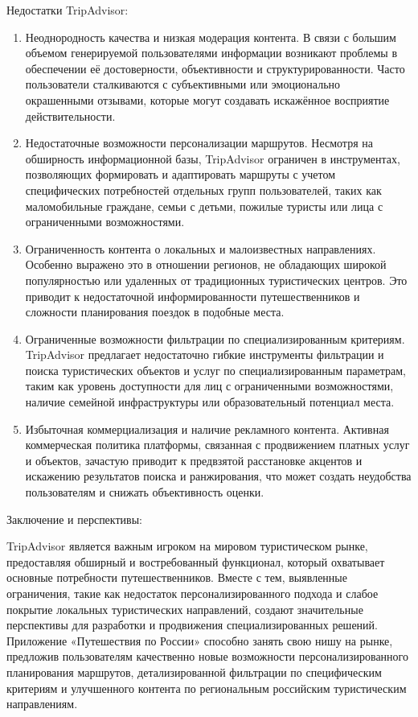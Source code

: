 \noindent Недостатки TripAdvisor:
\begin{enumerate}
    \item Неоднородность качества и низкая модерация контента. В связи с большим объемом генерируемой пользователями информации возникают проблемы в обеспечении её достоверности, объективности и структурированности. Часто пользователи сталкиваются с субъективными или эмоционально окрашенными отзывами, которые могут создавать искажённое восприятие действительности.
    \item Недостаточные возможности персонализации маршрутов. Несмотря на обширность информационной базы, TripAdvisor ограничен в инструментах, позволяющих формировать и адаптировать маршруты с учетом специфических потребностей отдельных групп пользователей, таких как маломобильные граждане, семьи с детьми, пожилые туристы или лица с ограниченными возможностями.
    \item Ограниченность контента о локальных и малоизвестных направлениях. Особенно выражено это в отношении регионов, не обладающих широкой популярностью или удаленных от традиционных туристических центров. Это приводит к недостаточной информированности путешественников и сложности планирования поездок в подобные места.
    \item Ограниченные возможности фильтрации по специализированным критериям. TripAdvisor предлагает недостаточно гибкие инструменты фильтрации и поиска туристических объектов и услуг по специализированным параметрам, таким как уровень доступности для лиц с ограниченными возможностями, наличие семейной инфраструктуры или образовательный потенциал места.
    \item Избыточная коммерциализация и наличие рекламного контента. Активная коммерческая политика платформы, связанная с продвижением платных услуг и объектов, зачастую приводит к предвзятой расстановке акцентов и искажению результатов поиска и ранжирования, что может создать неудобства пользователям и снижать объективность оценки.
\end{enumerate}

\noindent Заключение и перспективы:

TripAdvisor является важным игроком на мировом туристическом рынке, предоставляя обширный и востребованный функционал, который охватывает основные потребности путешественников. Вместе с тем, выявленные ограничения, такие как недостаток персонализированного подхода и слабое покрытие локальных туристических направлений, создают значительные перспективы для разработки и продвижения специализированных решений. Приложение «Путешествия по России» способно занять свою нишу на рынке, предложив пользователям качественно новые возможности персонализированного планирования маршрутов, детализированной фильтрации по специфическим критериям и улучшенного контента по региональным российским туристическим направлениям.

